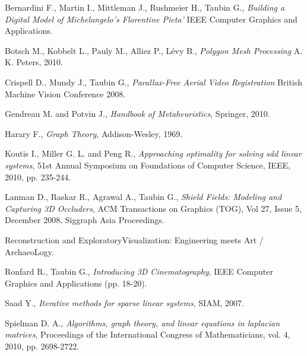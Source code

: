 \documentclass[conference,compsoc,a4paper]{IEEEtran}
\begin{document}
\begin{thebibliography}{1}

Bernardini F., Martin I., Mittleman J., Rushmeier H., Taubin G.,
\newblock \textit{Building a Digital Model of Michelangelo's Florentine Pieta'}
\newblock IEEE Computer Graphics and Applications.

Botsch M., Kobbelt L., Pauly M., Alliez P., Lévy B.,
\newblock \textit{Polygon Mesh Processing}
\newblock A. K. Peters, 2010.

Crispell D., Mundy J., Taubin G.,
\newblock \textit{Parallax-Free Aerial Video Registration}
\newblock British Machine Vision Conference 2008.



Gendreau M. and Potvin J., 
\newblock \textit{Handbook of Metaheuristics}, 
\newblock Springer, 2010.

Harary F., 
\newblock \textit{Graph Theory}, 
\newblock Addison-Wesley, 1969.

Koutis I., Miller G. L. and Peng R., 
\newblock \textit{Approaching optimality for solving sdd linear systems}, 
\newblock 51st Annual Symposium on Foundations of Computer Science, IEEE, 
2010, pp. 235-244.

Lanman D., Raskar R., Agrawal A., Taubin G., 
\newblock \textit{Shield Fields: Modeling and Capturing 3D Occluders}, 
\newblock ACM Transactions on Graphics (TOG), Vol 27, Issue 5, December 
2008, Siggraph Asia Proceedings.


\newblock Reconstruction and ExploratoryVisualization: Engineering 
meets Art / ArchaeoLogy.

Ronfard R., Taubin G., 
\newblock \textit{Introducing 3D Cinematography}, 
\newblock IEEE Computer Graphics and Applications (pp. 18-20).


Saad Y., 
\newblock \textit{Iterative methods for sparse linear systems}, 
\newblock SIAM, 2007.

Spielman D. A.,
\newblock \textit{Algorithms, graph theory, and linear equations in laplacian 
matrices}, 
\newblock Proceedings of the International Congress of Mathematicians, vol. 4, 
2010, pp. 2698-2722.


\end{thebibliography}
\end{document}
